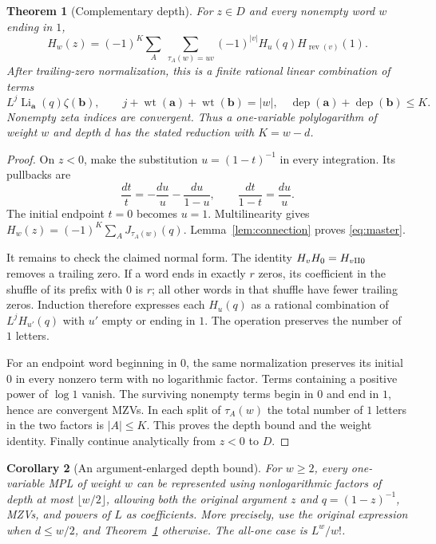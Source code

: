 \documentclass[11pt]{article}
\numberwithin{equation}{section}
\newtheorem{theorem}{Theorem}[section]
\newtheorem{corollary}[theorem]{Corollary}
\theoremstyle{definition}\newtheorem{definition}[theorem]{Definition}
\theoremstyle{remark}\newtheorem{remark}[theorem]{Remark}
\DeclareMathOperator{\Li}{Li}
\DeclareMathOperator{\dep}{dep}
\DeclareMathOperator{\wt}{wt}
\begin{document}
\begin{theorem}[Complementary depth]\label{thm:complement}
For $z\in D$ and every nonempty word $w$ ending in $1$,
\begin{equation}\label{eq:master}
 H_w(z)=(-1)^K\sum_A\ \sum_{\tau_A(w)=uv}
 (-1)^{|v|}H_u(q)H_{\operatorname{rev}(v)}(1).
\end{equation}
After trailing-zero normalization, this is a finite rational linear
combination of terms
\begin{equation}\label{eq:termshape}
 L^j\Li_{\boldsymbol a}(q)\zeta(\boldsymbol b),\qquad
 j+\wt(\boldsymbol a)+\wt(\boldsymbol b)=|w|,
 \quad \dep(\boldsymbol a)+\dep(\boldsymbol b)\le K.
\end{equation}
Nonempty zeta indices are convergent. Thus a one-variable polylogarithm
of weight $w$ and depth $d$ has the stated reduction with $K=w-d$.
\end{theorem}
\begin{proof}
On $z<0$, make the substitution $u=(1-t)^{-1}$ in every integration.
Its pullbacks are
\begin{equation}\label{eq:pullbacks}
 \frac{dt}{t}=-\frac{du}{u}-\frac{du}{1-u},\qquad
 \frac{dt}{1-t}=\frac{du}{u}.
\end{equation}
The initial endpoint $t=0$ becomes $u=1$. Multilinearity gives
$H_w(z)=(-1)^K\sum_A J_{\tau_A(w)}(q)$.
Lemma~\ref{lem:connection} proves \eqref{eq:master}.

It remains to check the claimed normal form. The identity
$H_vH_0=H_{v\mathbin{\amalg}0}$ removes a trailing zero. If a word ends in exactly
$r$ zeros, its coefficient in the shuffle of its prefix with $0$ is
$r$; all other words in that shuffle have fewer trailing zeros.
Induction therefore expresses each $H_u(q)$ as a rational combination
of $L^jH_{u'}(q)$ with $u'$ empty or ending in $1$.
The operation preserves the number of $1$ letters.

For an endpoint word beginning in $0$, the same normalization preserves
its initial $0$ in every nonzero term with no logarithmic factor.
Terms containing a positive power of $\log1$ vanish. The surviving
nonempty terms begin in $0$ and end in $1$, hence are convergent MZVs.
In each split of $\tau_A(w)$ the total number of $1$ letters in the
two factors is $|A|\le K$. This proves the depth bound and the weight
identity. Finally continue analytically from $z<0$ to $D$.
\end{proof}

\begin{corollary}[An argument-enlarged depth bound]\label{cor:halfb}
For $w\ge2$, every one-variable MPL of weight $w$ can be represented
using nonlogarithmic factors of depth at most $\lfloor w/2\rfloor$,
allowing both the original argument $z$ and $q=(1-z)^{-1}$, MZVs, and
powers of $L$ as coefficients. More precisely, use the original
expression when $d\le w/2$, and Theorem~\ref{thm:complement} otherwise.
The all-one case is $L^w/w!$.
\end{corollary}
\end{document}
